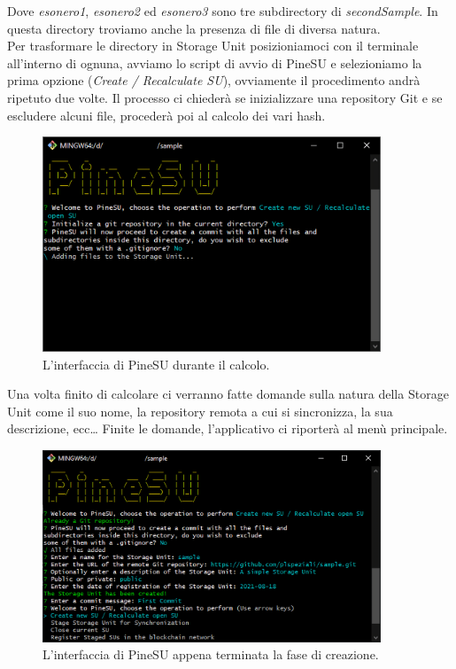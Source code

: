 Dove \emph{esonero1}, \emph{esonero2} ed \emph{esonero3} sono tre subdirectory di \emph{secondSample}.
In questa directory troviamo anche la presenza di file di diversa natura. \\


Per trasformare le directory in Storage Unit posizioniamoci con il terminale all'interno di ognuna,
avviamo lo script di avvio di PineSU e selezioniamo la prima opzione (\emph{Create / Recalculate SU}),
ovviamente il procedimento andrà ripetuto due volte.
Il processo ci chiederà se inizializzare una repository Git e se escludere alcuni file,
procederà poi al calcolo dei vari hash.

\begin{figure}[H]
    \centering
    \includegraphics[width=0.9\textwidth]{Figures/calculating}
    \caption{\small{
    L'interfaccia di PineSU durante il calcolo.
    } %
    } %
    \label{fi:calc}
\end{figure}


Una volta finito di calcolare ci verranno fatte domande sulla natura della Storage Unit come il suo nome,
la repository remota a cui si sincronizza, la sua descrizione, ecc\dots
Finite le domande, l'applicativo ci riporterà al menù principale.

\begin{figure}[H]
    \centering
    \includegraphics[width=0.9\textwidth]{Figures/doneCalculating}
    \caption{\small{
    L'interfaccia di PineSU appena terminata la fase di creazione.
    } %
    } %
    \label{fi:dcalc}
\end{figure}

